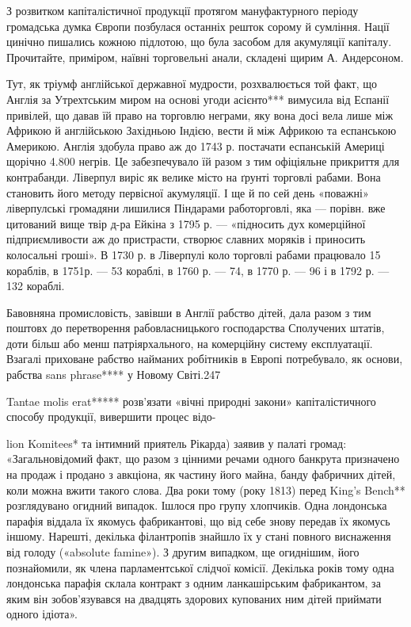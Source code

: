 З розвитком капіталістичної продукції протягом мануфактурного
періоду громадська думка Європи позбулася останніх решток
сорому й сумління. Нації цинічно пишались кожною підлотою,
що була засобом для акумуляції капіталу. Прочитайте, приміром,
наївні торговельні анали, складені щирим А. Андерсоном.

Тут, як тріумф англійської державної мудрости, розхвалюється
той факт, що Англія за Утрехтським миром на основі
угоди асієнто*** вимусила від Еспанії привілей, що давав їй
право на торговлю неграми, яку вона досі вела лише між Африкою
й англійською Західньою Індією, вести й між Африкою та
еспанською Америкою. Англія здобула право аж до 1743 р. постачати
еспанській Америці щорічно 4.800 негрів. Це забезпечувало
їй разом з тим офіціяльне прикриття для контрабанди.
Ліверпул виріс як велике місто на ґрунті торговлі рабами.
Вона становить його методу первісної акумуляції. І ще й по сей
день «поважні» ліверпулські громадяни лишилися Піндарами
работорговлі, яка — порівн. вже цитований вище твір д-ра Ейкіна
з 1795 р. — «підносить дух комерційної підприємливости аж до
пристрасти, створює славних моряків і приносить колосальні
гроші». В 1730 р. в Ліверпулі коло торговлі рабами працювало
15 кораблів, в 1751р. — 53 кораблі, в 1760 р. — 74, в 1770 р. —
96 і в 1792 р. — 132 кораблі.

Бавовняна промисловість, завівши в Англії рабство дітей,
дала разом з тим поштовх до перетворення рабовласницького
господарства Сполучених штатів, доти більш або менш патріярхального,
на комерційну систему експлуатації. Взагалі приховане
рабство найманих робітників в Европі потребувало, як основи,
рабства sans phrase**** у Новому Світі.247

Tantae molis erat***** розв’язати «вічні природні закони»
капіталістичного способу продукції, вивершити процес відо-

lion Komitees* та інтимний приятель Рікарда) заявив у палаті громад:
«Загальновідомий факт, що разом з цінними речами одного банкрута
призначено на продаж і продано з авкціона, як частину його майна, банду
фабричних дітей, коли можна вжити такого слова. Два роки тому (року
1813) перед King’s Bench** розглядувано огидний випадок. Ішлося про
групу хлопчиків. Одна лондонська парафія віддала їх якомусь фабрикантові,
що від себе знову передав їх якомусь іншому. Нарешті, декілька філантропів
знайшло їх у стані повного виснаження від голоду («absolute
famine»). З другим випадком, ще огиднішим, його познайомили, як члена
парламентської слідчої комісії. Декілька років тому одна лондонська
парафія склала контракт з одним ланкашірським фабрикантом, за яким
він зобов’язувався на двадцять здорових купованих ним дітей приймати
одного ідіота».

